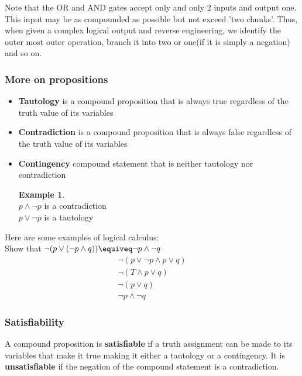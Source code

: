 \documentclass[titlepage]{article}
\theoremstyle{definition}
\newtheorem{example}{Example}
\numberwithin{equation}{subsection}
\numberwithin{remark}{subsection}
\begin{document}
Note that the OR and AND gates accept only and only 2 inputs and output one. This input may be as compounded as possible but not exceed 'two chunks'. Thus, when given a complex logical output and reverse engineering, we identify the outer most outer operation, branch it into two or one(if it is simply a negation) and so on. 

\subsubsection{More on propositions}

\begin{tcolorbox}
\begin{itemize}
    \item \textbf{Tautology} is a compound proposition that is always true regardless of the truth value of its variables
    \item \textbf{Contradiction} is a compound proposition that is always false regardless of the truth value of its variables 
    \item \textbf{Contingency} compound statement that is neither tautology nor contradiction
    
    \begin{example}
    \\
    $p \land \neg p$ is a contradiction
    \\
    $p \lor \neg p$ is a tautology
    \end{example}
\end{itemize}
\end{tcolorbox}

Here are some examples of logical calculus:
\\
Show that $\neg(p \lor (\neg p \land q )) \equiveq \neg p \land \neg q$
\begin{align*}
    \neg(p\lor\neg p \land p \lor q)\\
    \neg(T \land p \lor q)\\
    \neg(p \lor q)\\
    \neg p \land \neg q
\end{align*}

\subsubsection{Satisfiability}

A compound proposition is \textbf{satisfiable} if a truth assignment can be made to its variables that make it true making it either a tautology or a contingency. It is \textbf{unsatisfiable} if the negation of the compound statement is a contradiction. 
\end{document}
